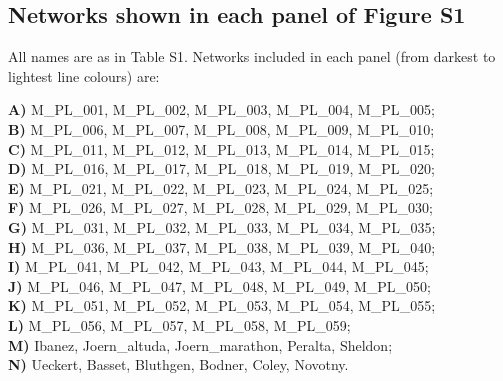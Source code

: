 \documentclass[12pt]{article}
\begin{document}
\begin{spacing}{1.0}
\subsection*{Networks shown in each panel of Figure S1}

All names are as in Table S1. Networks included in each panel (from darkest to lightest line colours) are:


\noindent \textbf{A)} M\_PL\_001, M\_PL\_002, M\_PL\_003, M\_PL\_004, M\_PL\_005;      \\
\textbf{B)} M\_PL\_006, M\_PL\_007, M\_PL\_008, M\_PL\_009, M\_PL\_010;    \\
\textbf{C)} M\_PL\_011, M\_PL\_012, M\_PL\_013, M\_PL\_014, M\_PL\_015;  \\
\textbf{D)} M\_PL\_016, M\_PL\_017, M\_PL\_018, M\_PL\_019, M\_PL\_020;   \\
\textbf{E)} M\_PL\_021, M\_PL\_022, M\_PL\_023, M\_PL\_024, M\_PL\_025;  \\
\textbf{F)} M\_PL\_026, M\_PL\_027, M\_PL\_028, M\_PL\_029, M\_PL\_030;  \\
\textbf{G)} M\_PL\_031, M\_PL\_032, M\_PL\_033, M\_PL\_034, M\_PL\_035; \\
\textbf{H)} M\_PL\_036, M\_PL\_037, M\_PL\_038, M\_PL\_039, M\_PL\_040;   \\
\textbf{I)} M\_PL\_041, M\_PL\_042, M\_PL\_043, M\_PL\_044, M\_PL\_045;\\
\textbf{J)} M\_PL\_046, M\_PL\_047, M\_PL\_048, M\_PL\_049, M\_PL\_050;  \\
\textbf{K)} M\_PL\_051, M\_PL\_052, M\_PL\_053, M\_PL\_054, M\_PL\_055;   \\
\textbf{L)} M\_PL\_056, M\_PL\_057, M\_PL\_058, M\_PL\_059;  \\
\textbf{M)} Ibanez, Joern\_altuda, Joern\_marathon, Peralta, Sheldon;  \\
\textbf{N)} Ueckert, Basset, Bluthgen, Bodner, Coley, Novotny.


\end{spacing}

\clearpage

\newpage

\renewcommand*{\bibfont}{\raggedright}

\end{document}
